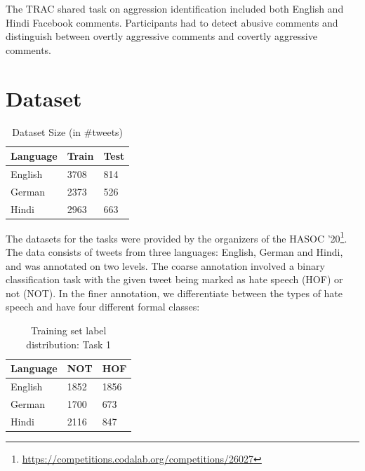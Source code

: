 \documentclass[
]{ceurart}
\begin{document}
The TRAC shared task\cite{ws-2018-trolling} on aggression identification included both English and Hindi Facebook comments. Participants had to detect abusive comments and distinguish between overtly aggressive comments and covertly aggressive comments.

\section{Dataset}

\begin{table}[]
\begin{tabular}{lll}
\toprule
\textbf{Language} & \textbf{Train} & \textbf{Test} \\
\midrule
English  & 3708  & 814  \\
German   & 2373  & 526 \\
Hindi    & 2963  & 663 
\end{tabular}
\caption{Dataset Size (in \#tweets)}
\label{tab:datastats}
\end{table}

The datasets for the tasks were provided by the organizers of the HASOC '20\footnote{\url{https://competitions.codalab.org/competitions/26027}}. The data consists of tweets from three languages: English, German and Hindi, and was annotated on two levels. The coarse annotation involved a binary classification task with the given tweet being marked as hate speech (HOF) or not (NOT). In the finer annotation, we differentiate between the types of hate speech and have four different formal classes:

\begin{table}[]
\begin{tabular}{lll}
\toprule
\textbf{Language} &\textbf{NOT} & \textbf{HOF} \\
\midrule
English  & 1852 & 1856 \\
German   & 1700 & 673 \\
Hindi    & 2116 & 847 
\end{tabular}
\caption{Training set label distribution: Task 1}
\label{tab:datacoarse}
\end{table}
\end{document}
